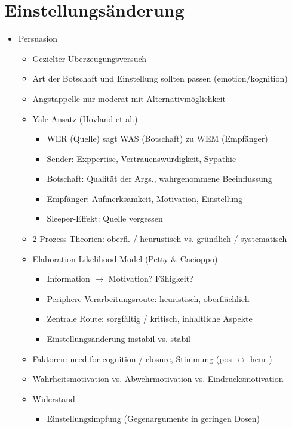 \documentclass[11pt, paper=a4, twocolumn]{scrartcl}
\begin{document}
	\section{Einstellungsänderung}
		\begin{itemize}
			\item Persuasion
				\begin{itemize}
					\item Gezielter Überzeugungsversuch
					\item Art der Botschaft und Einstellung sollten passen (emotion/kognition)
					\item Angstappelle nur moderat mit Alternativmöglichkeit
					\item Yale-Ansatz (Hovland et al.)
						\begin{itemize}
							\item WER (Quelle) sagt WAS (Botschaft) zu WEM (Empfänger)
							\item Sender: Exppertise, Vertrauenswürdigkeit, Sypathie
							\item Botschaft: Qualität der Args., wahrgenommene Beeinflussung
							\item Empfänger: Aufmerksamkeit, Motivation, Einstellung
							\item Sleeper-Effekt: Quelle vergessen
						\end{itemize}
					\item 2-Prozess-Theorien: oberfl. / heurustisch vs. gründlich / systematisch
					\item Elaboration-Likelihood Model (Petty \& Cacioppo)
						\begin{itemize}
							\item Information $\rightarrow$ Motivation? Fähigkeit?
							\item Periphere Verarbeitungsroute: heuristisch, oberflächlich
							\item Zentrale Route: sorgfältig / kritisch, inhaltliche Aspekte
							\item Einstellungsänderung instabil vs. stabil
						\end{itemize}
					\item Faktoren: need for cognition / closure, Stimmung (pos $\leftrightarrow$ heur.)
					\item Wahrheitsmotivation vs. Abwehrmotivation vs. Eindrucksmotivation
					\item Widerstand
						\begin{itemize}
							\item Einstellungsimpfung (Gegenargumente in geringen Dosen)

\end{itemize}
\end{itemize}
\end{itemize}
\end{document}
